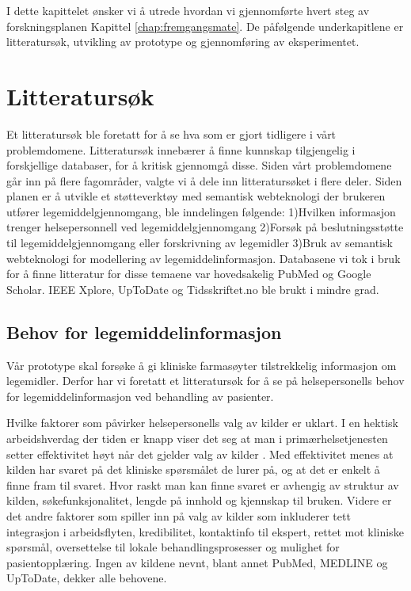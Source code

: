 I dette kapittelet ønsker vi å utrede hvordan vi gjennomførte hvert steg av forskningsplanen Kapittel \ref{chap:fremgangsmate}. De påfølgende underkapitlene er litteratursøk, utvikling av prototype og gjennomføring av eksperimentet.
\section{Litteratursøk}
Et litteratursøk ble foretatt for å se hva som er gjort tidligere i vårt problemdomene. Litteratursøk innebærer å finne kunnskap tilgjengelig i forskjellige databaser, for å kritisk gjennomgå disse. Siden vårt problemdomene går inn på flere fagområder, valgte vi å dele inn litteratursøket i flere deler. Siden planen er å utvikle et støtteverktøy med semantisk webteknologi der brukeren utfører legemiddelgjennomgang, ble inndelingen følgende: 1)Hvilken informasjon trenger helsepersonnell ved legemiddelgjennomgang 2)Forsøk på beslutningsstøtte til legemiddelgjennomgang eller forskrivning av legemidler 3)Bruk av semantisk webteknologi for modellering av legemiddelinformasjon. Databasene vi tok i bruk for å finne litteratur for disse temaene var hovedsakelig PubMed og Google Scholar. IEEE Xplore, UpToDate og Tidsskriftet.no ble brukt i mindre grad.              
\label{chap:gjenomf_litteratursok}
\subsection{Behov for legemiddelinformasjon}
Vår prototype skal forsøke å gi kliniske farmasøyter tilstrekkelig informasjon om legemidler. Derfor har vi foretatt et litteratursøk for å se på helsepersonells behov for legemiddelinformasjon ved behandling av pasienter.

Hvilke faktorer som påvirker helsepersonells valg av kilder er uklart. I en hektisk arbeidshverdag der tiden er knapp viser det seg at man i primærhelsetjenesten setter effektivitet høyt når det gjelder valg av kilder \citep{Cook_Sorensen_2013}. Med effektivitet menes at kilden har svaret på det kliniske spørsmålet de lurer på, og at det er enkelt å finne fram til svaret. Hvor raskt man kan finne svaret er avhengig av struktur av kilden, søkefunksjonalitet, lengde på innhold og kjennskap til bruken. Videre er det andre faktorer som spiller inn på valg av kilder som inkluderer tett integrasjon i arbeidsflyten, kredibilitet, kontaktinfo til ekspert, rettet mot kliniske spørsmål, oversettelse til lokale behandlingsprosesser og mulighet for pasientopplæring. Ingen av kildene nevnt, blant annet PubMed, MEDLINE og UpToDate, dekker alle behovene.


